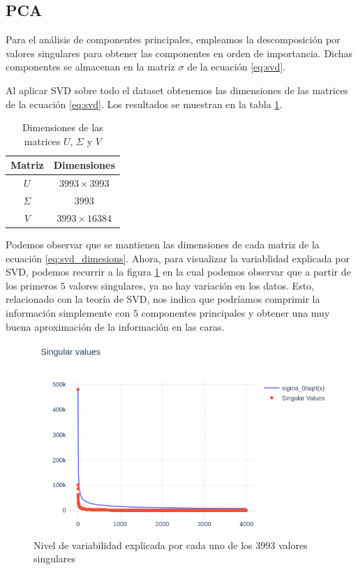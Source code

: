 \documentclass[conference]{IEEEtran}
\begin{document}
\subsection{PCA}
Para el análisis de componentes principales, empleamos la descomposición por valores singulares para obtener las componentes en orden de importancia. Dichas componentes se almacenan en la matriz $\sigma$ de la ecuación \ref{eq:svd}. 

Al aplicar SVD sobre todo el dataset obtenemos las dimensiones de las matrices de la ecuación \ref{eq:svd}. Los resultados se muestran en la tabla \ref{tab:svd_dimensions}. 

\begin{table}[H]
    \centering
    \begin{tabular}{|c|c|}
         \hline
         Matriz & Dimensiones \\ \hline
         $U$ & $3993 \times 3993$ \\ \hline
         $\Sigma$ & $3993$ \\ \hline
         $V$ & $3993 \times 16384$ \\ \hline
    \end{tabular}
    \caption{Dimensiones de las matrices $U$, $\Sigma$ y $V$}
    \label{tab:svd_dimensions}
\end{table}

Podemos observar que se mantienen las dimensiones de cada matriz de la ecuación \ref{eq:svd_dimesions}. Ahora, para visualizar la variablidad explicada por SVD, podemos recurrir a la figura \ref{fig:svd_graph} en la cual podemos observar que a partir de los primeros $5$ valores singulares, ya no hay variación en los datos. Esto, relacionado con la teoría de SVD, nos indica que podríamos comprimir la información simplemente con $5$ componentes principales y obtener una muy buena aproximación de la información en las caras. 

\begin{figure}[H]
    \centering
    \includegraphics[scale=0.35]{imgs/svd_variance.png}
    \caption{Nivel de variabilidad explicada por cada uno de los $3993$ valores singulares}
    \label{fig:svd_graph}
\end{figure}
\end{document}
